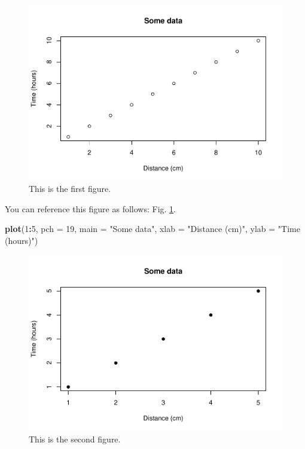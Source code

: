 \documentclass[12pt,halfline,a4paper,]{ouparticle}
\newenvironment{Shaded}{\begin{snugshade}}{\end{snugshade}}
\newcommand{\AttributeTok}[1]{\textcolor[rgb]{0.13,0.29,0.53}{#1}}
\newcommand{\DecValTok}[1]{\textcolor[rgb]{0.00,0.00,0.81}{#1}}
\newcommand{\FunctionTok}[1]{\textcolor[rgb]{0.13,0.29,0.53}{\textbf{#1}}}
\newcommand{\NormalTok}[1]{#1}
\newcommand{\SpecialCharTok}[1]{\textcolor[rgb]{0.81,0.36,0.00}{\textbf{#1}}}
\newcommand{\StringTok}[1]{\textcolor[rgb]{0.31,0.60,0.02}{#1}}
\begin{document}
\begin{figure}[p]
\includegraphics[width=1\linewidth]{skeleton_files/figure-latex/fig1-1} \caption{This is the first figure.}\label{fig:fig1}
\end{figure}

You can reference this figure as follows: Fig. \ref{fig:fig1}.

\begin{Shaded}
\begin{Highlighting}[]
\FunctionTok{plot}\NormalTok{(}\DecValTok{1}\SpecialCharTok{:}\DecValTok{5}\NormalTok{, }\AttributeTok{pch =} \DecValTok{19}\NormalTok{, }\AttributeTok{main =} \StringTok{"Some data"}\NormalTok{, }\AttributeTok{xlab =} \StringTok{"Distance (cm)"}\NormalTok{, }\AttributeTok{ylab =} \StringTok{"Time (hours)"}\NormalTok{)}
\end{Highlighting}
\end{Shaded}

\begin{figure}[p]
\includegraphics[width=1\linewidth]{skeleton_files/figure-latex/fig2-1} \caption{This is the second figure.}\label{fig:fig2}
\end{figure}
\end{document}
